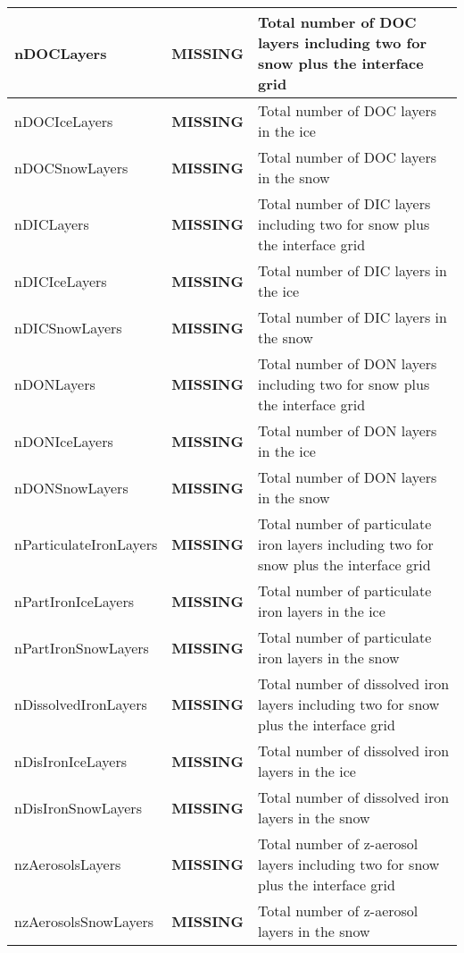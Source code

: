 {\begin{center}
\begin{longtable}{| p{1.0in} || p{1.0in} | p{4.0in} |}
    \hline
    nDOCLayers & {\bf \color{red} MISSING} & Total number of DOC layers including two for snow plus the interface grid \\ 
    \hline
    nDOCIceLayers & {\bf \color{red} MISSING} & Total number of DOC layers in the ice \\ 
    \hline
    nDOCSnowLayers & {\bf \color{red} MISSING} & Total number of DOC layers in the snow \\ 
    \hline
    nDICLayers & {\bf \color{red} MISSING} & Total number of DIC layers including two for snow plus the interface grid \\ 
    \hline
    nDICIceLayers & {\bf \color{red} MISSING} & Total number of DIC layers in the ice \\ 
    \hline
    nDICSnowLayers & {\bf \color{red} MISSING} & Total number of DIC layers in the snow \\ 
    \hline
    nDONLayers & {\bf \color{red} MISSING} & Total number of DON layers including two for snow plus the interface grid \\ 
    \hline
    nDONIceLayers & {\bf \color{red} MISSING} & Total number of DON layers in the ice \\ 
    \hline
    nDONSnowLayers & {\bf \color{red} MISSING} & Total number of DON layers in the snow \\ 
    \hline
    nParticulateIronLayers & {\bf \color{red} MISSING} & Total number of particulate iron layers including two for snow plus the interface grid \\ 
    \hline
    nPartIronIceLayers & {\bf \color{red} MISSING} & Total number of particulate iron layers in the ice \\ 
    \hline
    nPartIronSnowLayers & {\bf \color{red} MISSING} & Total number of particulate iron layers in the snow \\ 
    \hline
    nDissolvedIronLayers & {\bf \color{red} MISSING} & Total number of dissolved iron layers including two for snow plus the interface grid \\ 
    \hline
    nDisIronIceLayers & {\bf \color{red} MISSING} & Total number of dissolved iron layers in the ice \\ 
    \hline
    nDisIronSnowLayers & {\bf \color{red} MISSING} & Total number of dissolved iron layers in the snow \\ 
    \hline
    nzAerosolsLayers & {\bf \color{red} MISSING} & Total number of z-aerosol layers including two for snow plus the interface grid \\ 
    \hline
    nzAerosolsSnowLayers & {\bf \color{red} MISSING} & Total number of z-aerosol layers in the snow \\ 

\end{longtable}
\end{center}}
